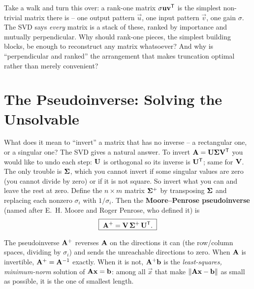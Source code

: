 \begin{walkbox}
Take a walk and turn this over: a rank-one matrix $\sigma\mathbf{u}\mathbf{v}^{\mathsf{T}}$ is the
simplest non-trivial matrix there is -- one output pattern $\vec{u}$, one input
pattern $\vec{v}$, one gain $\sigma$. The SVD says \emph{every} matrix is a stack
of these, ranked by importance and mutually perpendicular. Why should rank-one
pieces, the simplest building blocks, be enough to reconstruct any matrix
whatsoever? And why is ``perpendicular and ranked'' the arrangement that makes
truncation optimal rather than merely convenient?
\end{walkbox}

\section{The Pseudoinverse: Solving the Unsolvable}
\label{ch29:pseudoinverse}

What does it mean to ``invert'' a matrix that has no inverse -- a rectangular one,
or a singular one? The SVD gives a natural answer. To invert
$\mathbf{A} = \mathbf{U}\mathbf{\Sigma}\mathbf{V}^{\mathsf{T}}$ you would like to undo each step:
$\mathbf{U}$ is orthogonal so its inverse is $\mathbf{U}^{\mathsf{T}}$; same for $\mathbf{V}$. The only
trouble is $\mathbf{\Sigma}$, which you cannot invert if some singular values are
zero (you cannot divide by zero) or if it is not square. So invert what you can
and leave the rest at zero. Define the $n\times m$ matrix
$\mathbf{\Sigma}^+$ by transposing $\mathbf{\Sigma}$ and replacing each nonzero
$\sigma_i$ with $1/\sigma_i$. Then the \textbf{Moore--Penrose pseudoinverse}
(named after E.~H. Moore and Roger Penrose, who defined it) is
\[
  \boxed{\;\mathbf{A}^+ = \mathbf{V}\,\mathbf{\Sigma}^+\,\mathbf{U}^{\mathsf{T}}.\;}
\]

\begin{focusbox}
The pseudoinverse $\mathbf{A}^+$ reverses $\mathbf{A}$ on the directions it can
(the row/column spaces, dividing by $\sigma_i$) and sends the unreachable
directions to zero. When $\mathbf{A}$ is invertible, $\mathbf{A}^+ =
\mathbf{A}^{-1}$ exactly. When it is not, $\mathbf{A}^+\mathbf{b}$ is the
\emph{least-squares, minimum-norm} solution of $\mathbf{A}\mathbf{x} = \mathbf{b}$: among
all $\vec{x}$ that make $\lVert\mathbf{A}\mathbf{x} - \mathbf{b}\rVert$ as small as possible,
it is the one of smallest length.
\end{focusbox}

